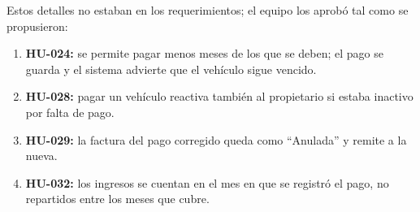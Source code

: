 Estos detalles no estaban en los requerimientos; el equipo los aprobó tal como se propusieron:


\begin{enumerate}
  \item \textbf{HU-024:} se permite pagar menos meses de los que se deben; el pago se guarda y el sistema advierte que el vehículo sigue vencido.
  \item \textbf{HU-028:} pagar un vehículo reactiva también al propietario si estaba inactivo por falta de pago.
  \item \textbf{HU-029:} la factura del pago corregido queda como ``Anulada'' y remite a la nueva.
  \item \textbf{HU-032:} los ingresos se cuentan en el mes en que se registró el pago, no repartidos entre los meses que cubre.
\end{enumerate}